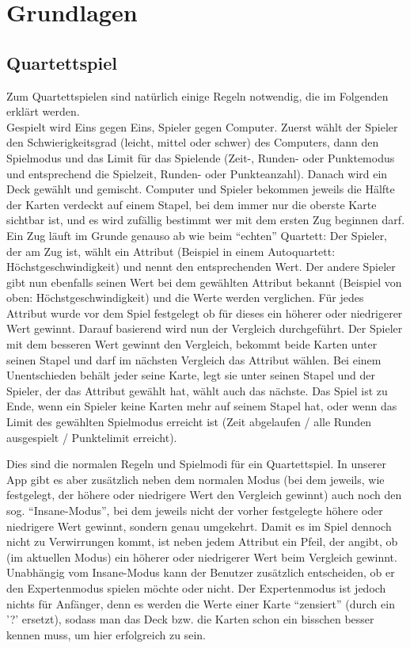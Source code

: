 \chapter{Grundlagen}
\label{cha:grundlagen}

\section{Quartettspiel}
\label{sec:grundlagen:quartettspiel}

Zum Quartettspielen sind natürlich einige Regeln notwendig, die im Folgenden erklärt werden. \\
Gespielt wird Eins gegen Eins, Spieler gegen Computer. Zuerst wählt der Spieler den Schwierigkeitsgrad (leicht, mittel oder schwer) des Computers, dann den Spielmodus und das Limit für das Spielende (Zeit-, Runden- oder Punktemodus und entsprechend die Spielzeit, Runden- oder Punkteanzahl). Danach wird ein Deck gewählt und gemischt. Computer und Spieler bekommen jeweils die Hälfte der Karten verdeckt auf einem Stapel, bei dem immer nur die oberste Karte sichtbar ist, und es wird zufällig bestimmt wer mit dem ersten Zug beginnen darf. Ein Zug läuft im Grunde genauso ab wie beim ``echten'' Quartett: Der Spieler, der am Zug ist, wählt ein Attribut (Beispiel in einem Autoquartett: Höchstgeschwindigkeit) und nennt den entsprechenden Wert. Der andere Spieler gibt nun ebenfalls seinen Wert bei dem gewählten Attribut bekannt (Beispiel von oben: Höchstgeschwindigkeit) und die Werte werden verglichen. Für jedes Attribut wurde vor dem Spiel festgelegt ob für dieses ein höherer oder niedrigerer Wert gewinnt. Darauf basierend wird nun der Vergleich durchgeführt. Der Spieler mit dem besseren Wert gewinnt den Vergleich, bekommt beide Karten unter seinen Stapel und darf im nächsten Vergleich das Attribut wählen. Bei einem Unentschieden behält jeder seine Karte, legt sie unter seinen Stapel und der Spieler, der das Attribut gewählt hat, wählt auch das nächste. Das Spiel ist zu Ende, wenn ein Spieler keine Karten mehr auf seinem Stapel hat, oder wenn das Limit des gewählten Spielmodus erreicht ist (Zeit abgelaufen / alle Runden ausgespielt / Punktelimit erreicht).

Dies sind die normalen Regeln und Spielmodi für ein Quartettspiel. In unserer App gibt es aber zusätzlich neben dem normalen Modus (bei dem jeweils, wie festgelegt, der höhere oder niedrigere Wert den Vergleich gewinnt) auch noch den sog. ``Insane-Modus'', bei dem jeweils nicht der vorher festgelegte höhere oder niedrigere Wert gewinnt, sondern genau umgekehrt. Damit es im Spiel dennoch nicht zu Verwirrungen kommt, ist neben jedem Attribut ein Pfeil, der angibt, ob (im aktuellen Modus) ein höherer oder niedrigerer Wert beim Vergleich gewinnt.
Unabhängig vom Insane-Modus kann der Benutzer zusätzlich entscheiden, ob er den Expertenmodus spielen möchte oder nicht. Der Expertenmodus ist jedoch nichts für Anfänger, denn es werden die Werte einer Karte ``zensiert'' (durch ein '?' ersetzt), sodass man das Deck bzw. die Karten schon ein bisschen besser kennen muss, um hier erfolgreich zu sein.


